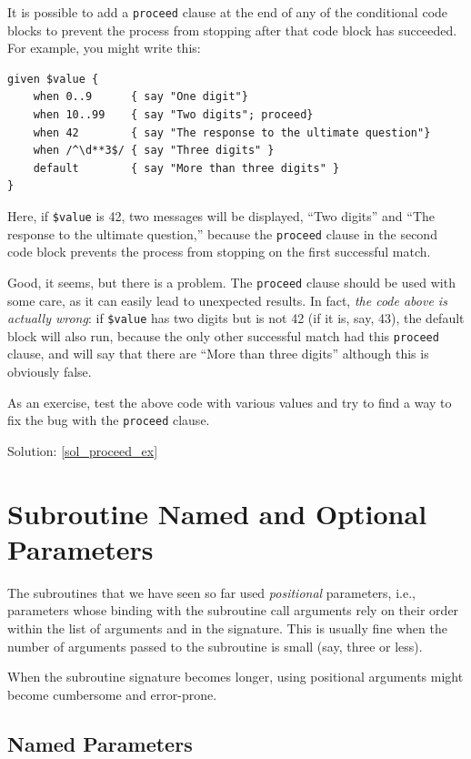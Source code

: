 It is possible to add a {\tt proceed} clause at the end of 
any of the conditional code blocks to prevent the process 
from stopping after that code block has succeeded. For example, 
you might write this:

\begin{verbatim}
given $value {
    when 0..9      { say "One digit"}
    when 10..99    { say "Two digits"; proceed}
    when 42        { say "The response to the ultimate question"}
    when /^\d**3$/ { say "Three digits" }
    default        { say "More than three digits" }
}
\end{verbatim}

Here, if \verb'$value' is 42, two messages will be displayed,  
``Two digits'' and ``The response to the ultimate question,'' 
because the {\tt proceed} clause in the second code block 
prevents the process from stopping on the first successful match.

Good, it seems, but there is a problem. The {\tt proceed} clause 
should be used with some care, as it can easily lead 
to unexpected results. In fact, \emph{the code above 
is actually wrong}: if \verb'$value' has two digits but is 
not 42 (if it is, say, 43), the default block will also run, 
because the only other successful match had this {\tt proceed} 
clause, and will say that there are ``More than three digits'' 
although this is obviously false. 

\label{proceed_ex}
As an exercise, test the above code with various values and 
try to find a way to fix the bug with the {\tt proceed} 
clause.

Solution: \ref{sol_proceed_ex}

\section{Subroutine Named and Optional Parameters}

The subroutines that we have seen so far used \emph{positional} 
parameters, i.e., parameters whose binding with the subroutine 
call arguments rely on their order within the list of 
arguments and in the signature. This is usually fine when 
the number of arguments passed to the subroutine is small 
(say, three or less). 

When the subroutine signature becomes longer, using positional 
arguments might become cumbersome and error-prone. 

\subsection{Named Parameters}

